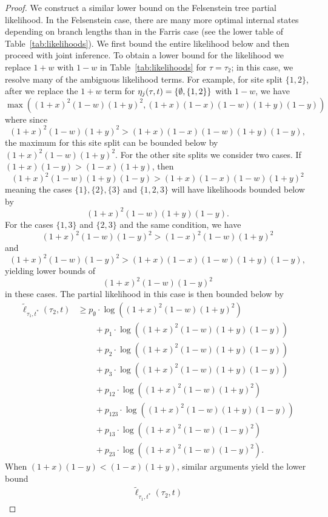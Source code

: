 \begin{proof}
We construct a similar lower bound on the Felsenstein tree partial likelihood.
In the Felsenstein case, there are many more optimal internal states depending on branch lengths than in the Farris case (see the lower table of Table~\ref{tab:likelihoods}).
We first bound the entire likelihood below and then proceed with joint inference.
To obtain a lower bound for the likelihood we replace $1+w$ with $1-w$ in Table~\ref{tab:likelihoods} for $\tau = \tau_2$; in this case, we resolve many of the ambiguous likelihood terms.
For example, for site split $\{1,2\}$, after we replace the $1+w$ term for $\eta_j(\tau, t)=\{\emptyset, \{1,2\}\}$ with $1-w$, we have
$$
\max\left((1+x)^2 (1-w)(1+y)^2, (1+x)(1-x)(1-w)(1+y)(1-y)\right)
$$
where since
$$
(1+x)^2 (1-w)(1+y)^2 > (1+x)(1-x)(1-w)(1+y)(1-y),
$$
the maximum for this site split can be bounded below by $(1+x)^2 (1-w)(1+y)^2$.
For the other site splits we consider two cases.
If $(1+x)(1-y) > (1-x)(1+y)$, then
$$
(1+x)^2(1-w)(1+y)(1-y) > (1+x)(1-x)(1-w)(1+y)^2
$$
meaning the cases $\{1\}, \{2\}, \{3\}$ and $\{1,2,3\}$ will have likelihoods bounded below by
$$
(1+x)^2(1-w)(1+y)(1-y).
$$
For the cases $\{1,3\}$ and $\{2,3\}$ and the same condition, we have
$$
(1+x)^2(1-w)(1-y)^2 > (1-x)^2(1-w)(1+y)^2
$$
and
$$
(1+x)^2(1-w)(1-y)^2 > (1+x)(1-x)(1-w)(1+y)(1-y),
$$
yielding lower bounds of
$$
(1+x)^2(1-w)(1-y)^2
$$
in these cases.
The partial likelihood in this case is then bounded below by
\begin{align*}
    \tilde{\ell}_{\tau_1,t^*}(\tau_2, t)
    &\ge      p_{\emptyset}  \cdot\log((1+x)^2   (1-w)(1+y)^2) \\
    &\qquad + p_{1}          \cdot\log((1+x)^2   (1-w)(1+y)(1-y)) \\
    &\qquad + p_{2}          \cdot\log((1+x)^2   (1-w)(1+y)(1-y)) \\
    &\qquad + p_{3}          \cdot\log((1+x)^2   (1-w)(1+y)(1-y)) \\
    &\qquad + p_{12}         \cdot\log((1+x)^2   (1-w)(1+y)^2) \\
    &\qquad + p_{123}        \cdot\log((1+x)^2   (1-w)(1+y)(1-y))\\
    &\qquad + p_{13}         \cdot\log((1+x)^2   (1-w)(1-y)^2) \\
    &\qquad + p_{23}         \cdot\log((1+x)^2   (1-w)(1-y)^2).
\end{align*}
When $(1+x)(1-y) < (1-x)(1+y)$, similar arguments yield the lower bound
\begin{align*}
    \tilde{\ell}_{\tau_1,t^*}(\tau_2, t)

\end{align*}
\end{proof}

